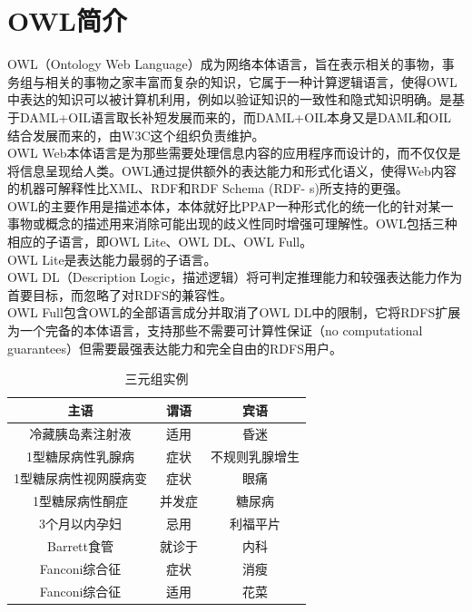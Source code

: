 	
   \section{OWL简介}\label{sec:OWL}

    \indent
    OWL（Ontology Web Language）成为网络本体语言，旨在表示相关的事物，事务组与相关的事物之家丰富而复杂的知识，它属于一种计算逻辑语言，使得OWL中表达的知识可以被计算机利用，例如以验证知识的一致性和隐式知识明确。是基于DAML+OIL语言取长补短发展而来的，而DAML+OIL本身又是DAML和OIL 结合发展而来的，由W3C这个组织负责维护。\\
    \indent
    OWL Web本体语言是为那些需要处理信息内容的应用程序而设计的，而不仅仅是将信息呈现给人类。OWL通过提供额外的表达能力和形式化语义，使得Web内容的机器可解释性比XML、RDF和RDF Schema (RDF- s)所支持的更强。\\
    \indent
    OWL的主要作用是描述本体，本体就好比PPAP一种形式化的统一化的针对某一事物或概念的描述用来消除可能出现的歧义性同时增强可理解性。OWL包括三种相应的子语言，即OWL Lite、OWL DL、OWL Full。\\
    \indent
    OWL Lite是表达能力最弱的子语言。\\
    \indent
    OWL DL（Description Logic，描述逻辑）将可判定推理能力和较强表达能力作为首要目标，而忽略了对RDFS的兼容性。\\
    \indent
    OWL Full包含OWL的全部语言成分并取消了OWL DL中的限制，它将RDFS扩展为一个完备的本体语言，支持那些不需要可计算性保证（no computational guarantees）但需要最强表达能力和完全自由的RDFS用户。\\





    \begin{table}[h]
        \centering
        \begin{tabular}{|c|c|c|} %
            \hline
            主语&谓语&宾语\\
            \hline
            冷藏胰岛素注射液&适用&昏迷\\
            \hline
            1型糖尿病性乳腺病&症状&不规则乳腺增生\\
            \hline
            1型糖尿病性视网膜病变&症状&眼痛\\
            \hline
            1型糖尿病性酮症&并发症&糖尿病\\
            \hline
            3个月以内孕妇&忌用&利福平片\\
            \hline
            Barrett食管&就诊于&内科\\
            \hline
            Fanconi综合征&症状&消瘦\\
            \hline
            Fanconi综合征&适用&花菜\\

            \hline
        \end{tabular}
        \caption{三元组实例}
    \end{table}




